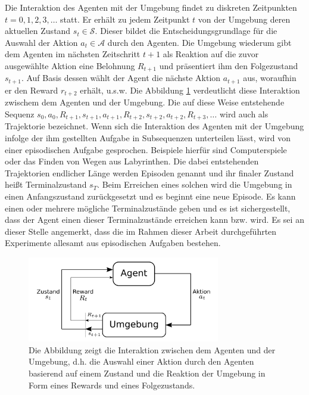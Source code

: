Die Interaktion des Agenten mit der Umgebung findet zu diskreten Zeitpunkten $t = 0, 1, 2, 3,\dots$ statt. Er erhält zu jedem Zeitpunkt $t$ von der Umgebung deren aktuellen Zustand $s_t \in \mathcal{S}$. Dieser bildet die Entscheidungsgrundlage für die Auswahl der Aktion $a_t \in \mathcal{A}$ durch den Agenten. Die Umgebung wiederum gibt dem Agenten im nächsten Zeitschritt $t+1$ als Reaktion auf die zuvor ausgewählte Aktion eine Belohnung $R_{t+1}$ und präsentiert ihm den Folgezustand $s_{t+1}$. Auf Basis dessen wählt der Agent die nächste Aktion $a_{t+1}$ aus, woraufhin er den Reward $r_{t+2}$ erhält, u.s.w. Die Abbildung \ref{fig_schnittstelle} verdeutlicht diese Interaktion zwischem dem Agenten und der Umgebung. Die auf diese Weise entstehende Sequenz $s_0, a_0, R_{t+1}, s_{t+1}, a_{t+1}, R_{t+2}, s_{t+2}, a_{t+2}, R_{t+3},\dots$ wird auch als Trajektorie bezeichnet. Wenn sich die Interaktion des Agenten mit der Umgebung infolge der ihm gestellten Aufgabe in Subsequenzen unterteilen lässt, wird von einer episodischen Aufgabe gesprochen. Beispiele hierfür sind Computerspiele oder das Finden von Wegen aus Labyrinthen. Die dabei entstehenden Trajektorien endlicher Länge werden Episoden genannt und ihr finaler Zustand heißt Terminalzustand $s_T$. Beim Erreichen eines solchen wird die Umgebung in einen Anfangszustand zurückgesetzt und es beginnt eine neue Episode. Es kann einen oder mehrere mögliche Terminalzustände geben und es ist sichergestellt, dass der Agent einen dieser Terminalzustände erreichen kann bzw. wird. Es sei an dieser Stelle angemerkt, dass die im Rahmen dieser Arbeit durchgeführten Experimente allesamt aus episodischen Aufgaben bestehen.

\begin{figure}[ht!]
  \centering
  \includegraphics[keepaspectratio,width=0.75\textwidth]{abbildungen/schnittstelle_agent_umgebung.pdf}
  \caption{Die Abbildung zeigt die Interaktion zwischen dem Agenten und der Umgebung, d.h. die Auswahl einer Aktion durch den Agenten basierend auf einem Zustand und die Reaktion der Umgebung in Form eines Rewards und eines Folgezustands.}
  \label{fig_schnittstelle}
\end{figure}

